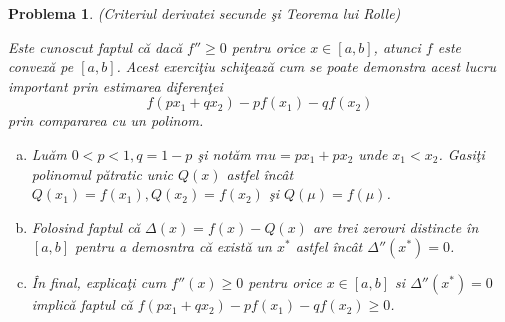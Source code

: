 \documentclass[a4paper,12pt,oneside]{report}
\newtheorem{problem}{Problema}
\begin{document}
\begin{problem} (Criteriul derivatei secunde \c{s}i Teorema lui Rolle)
  
Este cunoscut faptul c\u{a} dac\u{a} \({f}'' \geq 0\) pentru orice \(x\in \left [ a,b \right ]\), atunci \(f\) este convex\u{a} pe \(\left [ a,b \right ]\). Acest exerci\c{t}iu schi\c{t}eaz\u{a} cum se poate demonstra acest lucru important prin estimarea diferen\c{t}ei
\begin{displaymath}
  f\left ( px_{1} + qx_{2}\right ) - pf\left ( x_{1} \right ) - qf\left ( x_{2} \right )
\end{displaymath}
 prin compararea cu un polinom.
 \begin{enumerate}[a)]
\item Lu\u{a}m \(0< p < 1, q = 1-p\) \c{s}i not\u{a}m \(mu = px_{1} + px_{2}\) unde \(x_{1} < x_{2}\).  Gasi\c{t}i polinomul p\u{a}tratic unic \(Q\left ( x \right )\) astfel \^{i}nc\^{a}t  \(Q\left ( x_{1} \right ) = f\left ( x_{1} \right ), Q\left ( x_{2} \right ) = f\left ( x_{2} \right )\) \c{s}i \(Q\left ( \mu  \right ) = f\left ( \mu  \right )\).
\item Folosind faptul c\u{a} \(\Delta \left ( x \right ) =  f\left ( x \right ) - Q\left ( x \right )\) are trei zerouri distincte \^{i}n \(\left [ a,b \right ]\) pentru a demosntra c\u{a} exist\u{a} un \(x^{*}\) astfel \^{i}nc\^{a}t \({\Delta }''\left ( x^{*} \right ) = 0\).
\item \^{I}n final, explica\c{t}i cum \({f}''\left ( x \right ) \geq 0\) pentru orice \(x\in \left [ a,b \right ]\) si \({\Delta }''\left ( x^{*} \right ) = 0\) implic\u{a} faptul c\u{a} \(f\left ( px_{1} + qx_{2} \right ) - pf\left ( x_{1} \right ) - qf\left ( x_{2} \right ) \geq 0\).
\end{enumerate}
\end{problem}
\end{document}
